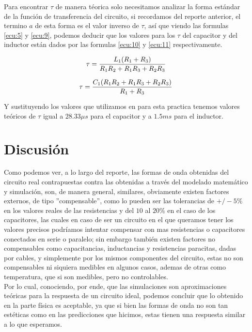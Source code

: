 \documentclass[letterpaper,spanish,12pt]{report}
\begin{document}
Para encontrar $\tau$ de manera t\'eorica solo necesitamos analizar la forma est\'andar de la funci\'on de transferencia del circuito, si recordamos del reporte anterior, el termino $a$ de esta forma es el valor inverso de $\tau$, as\'i que viendo las formulas \ref{ecu:5} y \ref{ecu:9}, podemos deducir que los valores para los $\tau$ del capacitor y del inductor est\'an dados por las formulas \ref{ecu:10} y \ref{ecu:11} respectivamente.

	\begin{equation}
		\centering
		\tau = \frac{L_{1}(R_{1}+R_{3})}{R_{1}R_{2}+R_{1}R_{3}+R_{2}R_{3}}
		\label{ecu:10}
	\end{equation}

	\begin{equation}
		\centering
		\tau = \frac{C_{1}(R_{1}R_{2}+R_{1}R_{3}+R_{2}R_{3})}{R_{1}+R_{3}}
		\label{ecu:11}
	\end{equation}

Y sustituyendo los valores que utilizamos en para esta practica tenemos valores te\'oricos de $\tau$ igual a $28.33 \mu s$ para el capacitor y a $1.5 ms$ para el inductor.

	\section{Discusi\'on}

Como podemos ver, a lo largo del reporte, las formas de onda obtenidas del circuito real contrapuestas contra las obtenidas a trav\'es del modelado matem\'atico y simulaci\'on, son, de manera general, similares, obviamente existen factores externos, de tipo ''compensable'', como lo pueden ser las tolerancias de $+/- 5\% $ en los valores reales de las resistencias y del $10$ al $20 \%$ en el caso de los capacitores, las cuales en caso de ser un circuito en el que queramos tener los valores precisos podr\'iamos intentar compensar con mas resistencias o capacitores conectados en serie o paralelo; sin embargo tambi\'en existen factores no compensables como capacitancias, inductancias y resistencias paracitas, dadas por cables, y simplemente por los mismos componentes del circuito, estas no son compensables ni siquiera medibles en algunos casos, ademas de otras como temperatura, que si son medibles, pero no controlables.\\ Por lo cual, conociendo, por ende, que las simulaciones son aproximaciones te\'oricas para la respuesta de un circuito ideal, podemos concluir que lo obtenido en la parte f\'isica es aceptable, ya que si bien las formas de onda no son tan est\'eticas como en las predicciones que hicimos, estas tienen una respuesta similar a lo que esperamos.
\end{document}
